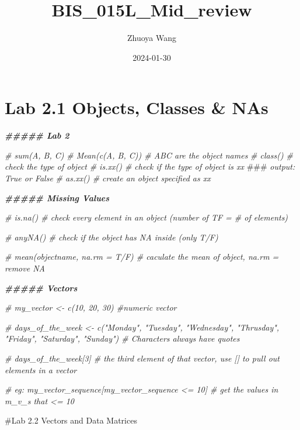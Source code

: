 \documentclass[
]{article}
\title{BIS\_015L\_Mid\_review}
\author{Zhuoya Wang}
\date{2024-01-30}
\newenvironment{Shaded}{\begin{snugshade}}{\end{snugshade}}
\newcommand{\AlertTok}[1]{\textcolor[rgb]{0.94,0.16,0.16}{#1}}
\newcommand{\CommentTok}[1]{\textcolor[rgb]{0.56,0.35,0.01}{\textit{#1}}}
\newcommand{\DocumentationTok}[1]{\textcolor[rgb]{0.56,0.35,0.01}{\textbf{\textit{#1}}}}
\begin{document}
\maketitle

\hypertarget{lab-2.1-objects-classes-nas}{%
\section{Lab 2.1 Objects, Classes \&
NAs}\label{lab-2.1-objects-classes-nas}}

\begin{Shaded}
\begin{Highlighting}[]
\DocumentationTok{\#\#\#\#\# Lab 2}

\CommentTok{\# sum(A, B, C)}
\CommentTok{\# Mean(c(A, B, C)) \# ABC are the object names}
\CommentTok{\# class() \# check the type of object}
\CommentTok{\# is.xx() \# check if the type of object is xx }\AlertTok{\#\#\#}\CommentTok{ output: True or False}
\CommentTok{\# as.xx() \# create an object specified as xx}

\DocumentationTok{\#\#\#\#\# Missing Values}

\CommentTok{\# is.na() \# check every element in an object (number of TF = \# of elements)}

\CommentTok{\# anyNA() \# check if the object has NA inside (only T/F)}

\CommentTok{\# mean(objectname, na.rm = T/F) \# caculate the mean of object, na.rm = remove NA}

\DocumentationTok{\#\#\#\#\# Vectors}

\CommentTok{\# my\_vector \textless{}{-} c(10, 20, 30) \#numeric vector}

\CommentTok{\# days\_of\_the\_week \textless{}{-} c("Monday", "Tuesday", "Wednesday", "Thrusday", "Friday", "Saturday", "Sunday") \# Characters always have quotes}


\CommentTok{\# days\_of\_the\_week[3] \# the third element of that vector, use \textasciigrave{}[]\textasciigrave{} to pull out elements in a vector}

\CommentTok{\# eg: my\_vector\_sequence[my\_vector\_sequence \textless{}= 10] \# get the values in m\_v\_s that \textless{}= 10}
\end{Highlighting}
\end{Shaded}

\#Lab 2.2 Vectors and Data Matrices
\end{document}
